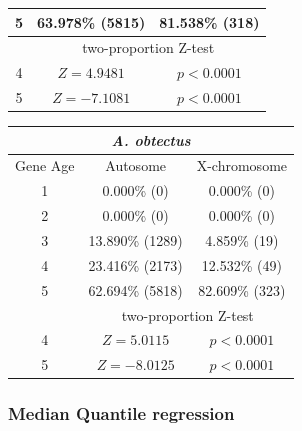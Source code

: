 \documentclass{article}
\begin{document}
\begin{table}[H]
\begin{tabular}{c |c | c}
        \hline
        5 & 63.978\% (5815) & 81.538\% (318)\\
        \hline
        \hline
        & \multicolumn{2}{c}{two-proportion Z-test}\\
        \hline
        4 & $Z = 4.9481$ & $p < 0.0001$ \\
        \hline
        5 & $Z = -7.1081$ & $p < 0.0001$ \\
    \end{tabular}
    \begin{tabular}{c |c | c}
        \multicolumn{3}{c}{\textit{A. obtectus}}\\
        \hline
        Gene Age & Autosome & X-chromosome \\
        \hline
        \hline
        1 & 0.000\% (0) & 0.000\% (0)\\
        \hline
        2 & 0.000\% (0) & 0.000\% (0)\\
        \hline
        3 & 13.890\% (1289) & 4.859\% (19)\\
        \hline
        4 & 23.416\% (2173) & 12.532\% (49)\\
        \hline
        5 & 62.694\% (5818) & 82.609\% (323)\\
        \hline
        \hline
        & \multicolumn{2}{c}{two-proportion Z-test}\\
        \hline
        4 & $Z = 5.0115$ & $p < 0.0001$ \\
        \hline
        5 & $Z = -8.0125$ & $p < 0.0001$ \\
    \end{tabular}
\end{table}


\subsubsection*{Median Quantile regression}
\end{document}
